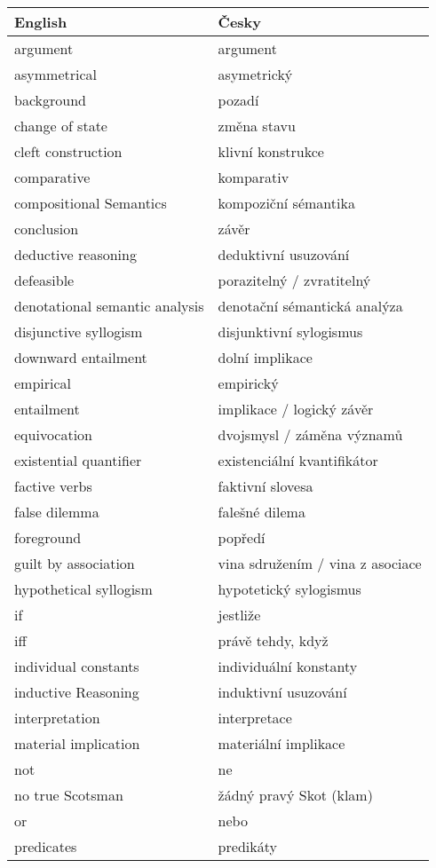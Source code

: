 \documentclass[a4paper,landscape,headrule,footrule,xetex]{foils}
\begin{document}
\begin{longtable}{ll}
  English & Česky \\\hline \endhead
argument & argument \\
asymmetrical & asymetrický \\
background & pozadí \\
change of state & změna stavu \\
cleft construction & klivní konstrukce \\
comparative & komparativ \\
compositional Semantics & kompoziční sémantika \\
conclusion & závěr \\
deductive reasoning & deduktivní usuzování \\
defeasible & porazitelný / zvratitelný \\
denotational semantic analysis & denotační sémantická analýza \\
disjunctive syllogism & disjunktivní sylogismus \\
downward entailment & dolní implikace \\
empirical & empirický \\
entailment & implikace / logický závěr \\
equivocation & dvojsmysl / záměna významů \\
existential quantifier & existenciální kvantifikátor \\
factive verbs & faktivní slovesa \\
false dilemma & falešné dilema \\
foreground & popředí \\
guilt by association & vina sdružením / vina z asociace \\
hypothetical syllogism & hypotetický sylogismus \\
if & jestliže \\
iff & právě tehdy, když \\
individual constants & individuální konstanty \\
inductive Reasoning & induktivní usuzování \\
interpretation & interpretace \\
material implication & materiální implikace \\
not & ne \\
no true Scotsman & žádný pravý Skot (klam) \\
or & nebo \\
predicates & predikáty \\

\end{longtable}
\end{document}
